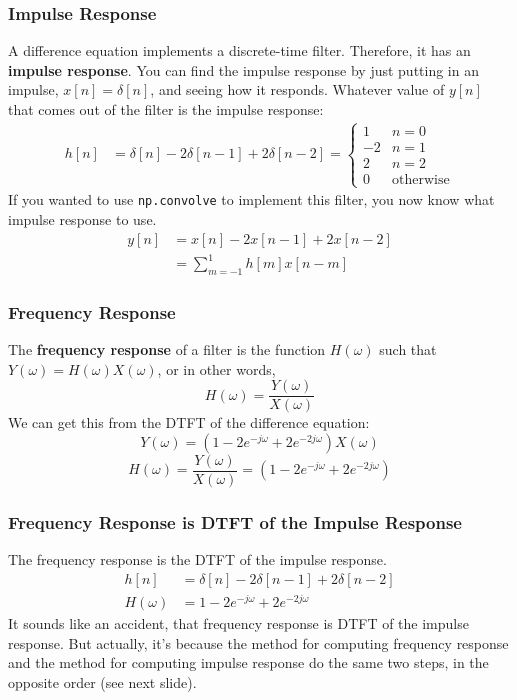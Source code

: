 \documentclass{beamer}
\begin{document}
\begin{frame}
  \frametitle{Impulse Response}

  A difference equation implements a discrete-time filter.  Therefore,
  it has an {\bf impulse response}.  You can find the impulse response
  by just putting in an impulse, $x[n]=\delta[n]$, and seeing how it
  responds.  Whatever value of $y[n]$ that comes out of the filter is
  the impulse response:
  \begin{align*}
    h[n] &= \delta[n]-2\delta[n-1]+2\delta[n-2]=\begin{cases}
    1 & n=0\\-2 & n=1\\2 & n=2\\0 & \mbox{otherwise}\end{cases}
  \end{align*}
  If you wanted to use {\tt np.convolve} to implement this filter, you
  now know what impulse response to use.
  \begin{align*}
    y[n] &= x[n] -2x[n-1]+2x[n-2]\\
    & = \sum_{m=-1}^1 h[m]x[n-m]
  \end{align*}
\end{frame}  

\begin{frame}
  \frametitle{Frequency Response}

  The {\bf frequency response} of a filter is the function $H(\omega)$ such that
  $Y(\omega)=H(\omega)X(\omega)$, or in other words,
  \[
  H(\omega) = \frac{Y(\omega)}{X(\omega)}
  \]
  We can get this from the DTFT of the difference equation:
  \[
  Y(\omega)  = \left(1-2e^{-j\omega}+2e^{-2j\omega}\right) X(\omega)
  \]
  \[
  H(\omega) = \frac{Y(\omega)}{X(\omega)} = \left(1-2e^{-j\omega}+2e^{-2j\omega}\right)
  \]
\end{frame}

\begin{frame}
  \frametitle{Frequency Response is DTFT of the Impulse Response}

  The frequency response is the DTFT of the impulse response.
  \begin{align*}
    h[n] &= \delta[n]-2\delta[n-1]+2\delta[n-2]\\
    H(\omega) &= 1-2e^{-j\omega}+2e^{-2j\omega}
  \end{align*}
  It sounds like an accident, that frequency response is DTFT of the
  impulse response.  But actually, it's because the method for
  computing frequency response and the method for computing impulse
  response do the same two steps, in the opposite order (see next slide).
\end{frame}
\end{document}
